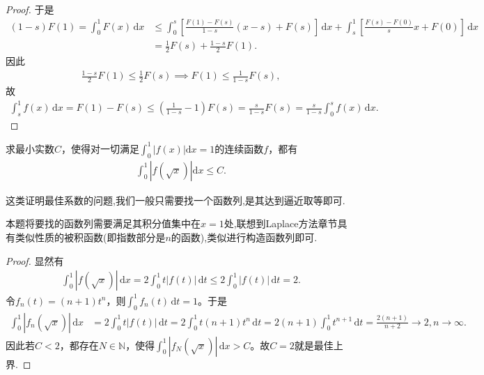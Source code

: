 \documentclass[../../main.tex]{subfiles}
\begin{document}
\begin{proof}
于是
\begin{align*}
(1 - s) F(1) = \int_0^1 F(x) \, \mathrm{d}x &\leqslant  \int_0^s \left[ \frac{F(1) - F(s)}{1 - s}(x - s) + F(s) \right] \, \mathrm{d}x + \int_s^1 \left[ \frac{F(s) - F(0)}{s}x + F(0) \right] \, \mathrm{d}x \\
&= \frac{1}{2} F(s) + \frac{1 - s}{2} F(1).
\end{align*}
因此
\begin{align*}
\frac{1 - s}{2} F(1) \leqslant  \frac{1}{2} F(s) \implies F(1) \leqslant  \frac{1}{1 - s} F(s),
\end{align*}
故
\begin{align*}
\int_s^1 f(x) \, \mathrm{d}x = F(1) - F(s) \leqslant  \left( \frac{1}{1 - s} - 1 \right) F(s) = \frac{s}{1 - s} F(s) = \frac{s}{1 - s} \int_0^s f(x) \, \mathrm{d}x.
\end{align*}
\end{proof}

\begin{example}
求最小实数$C$，使得对一切满足$\int_{0}^{1}|f(x)|\mathrm{d}x = 1$的连续函数$f$，都有
\begin{align*}
\int_{0}^{1}|f(\sqrt{x})|\mathrm{d}x \leqslant C.
\end{align*}
\end{example}
\begin{remark}
这类证明最佳系数的问题,我们一般只需要找一个函数列,是其达到逼近取等即可.

本题将要找的函数列需要满足其积分值集中在$x=1$处,联想到Laplace方法章节具有类似性质的被积函数(即指数部分是$n$的函数),类似进行构造函数列即可.
\end{remark}
\begin{proof}
显然有
\begin{align*}
\int_0^1 |f(\sqrt{x})| \, \mathrm{d}x = 2 \int_0^1 t |f(t)| \, \mathrm{d}t \leqslant 2 \int_0^1 |f(t)| \, \mathrm{d}t = 2.
\end{align*}
令$f_n(t) = (n+1) t^n$，则$\int_0^1 f_n(t) \, \mathrm{d}t = 1$。于是
\begin{align*}
\int_0^1 |f_n(\sqrt{x})| \, \mathrm{d}x &= 2 \int_0^1 t |f(t)| \, \mathrm{d}t = 2 \int_0^1 t (n+1) t^n \, \mathrm{d}t 
= 2 (n+1) \int_0^1 t^{n+1} \, \mathrm{d}t = \frac{2(n+1)}{n+2} \to 2, n \to \infty.
\end{align*}
因此若$C < 2$，都存在$N \in \mathbb{N}$，使得$\int_0^1 |f_N(\sqrt{x})| \, \mathrm{d}x > C$。故$C = 2$就是最佳上界.
\end{proof}
\end{document}
